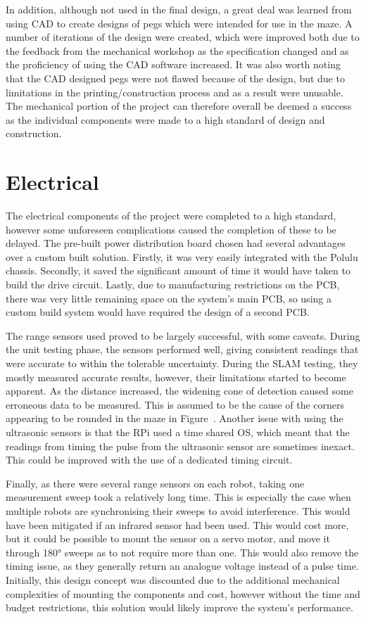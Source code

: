 In addition, although not used in the final design, a great deal was learned from
using CAD to create designs of pegs which were intended for use in the maze. A number
of iterations of the design were created, which were improved both due to the feedback from the mechanical workshop as the specification changed and as the proficiency of using the CAD software increased. It was also worth noting that the CAD designed pegs were not flawed
because of the design, but due to limitations in the printing/construction process and as a result were unusable.
The mechanical portion of the project can therefore overall be deemed a success as
the individual components were made to a high standard of design and construction.

\section{Electrical}\label{eval/elec}
The electrical components of the project were completed to a high standard,
however some unforeseen complications caused the completion of these to be delayed. The pre-built power distribution board chosen had several advantages over a
custom built solution. Firstly, it was very easily integrated with the Polulu
chassis. Secondly, it saved the significant amount of time it would have taken
to build the drive circuit. Lastly, due to manufacturing restrictions on the PCB,
there was very little remaining space on the system's main PCB, so using a custom
build system would have required the design of a second PCB.

The range sensors used proved to be largely successful, with some caveats.
During the unit testing phase, the sensors performed well, giving consistent
readings that were accurate to within the tolerable uncertainty. During the SLAM testing,
they mostly measured accurate results, however, their limitations started to
become apparent. As the distance increased, the widening cone of detection caused some
erroneous data to be measured. This is assumed to be the cause of the corners
appearing to be rounded in the maze in Figure~. Another issue with using the ultrasonic sensors is that the RPi used a time
shared OS, which meant that the readings from timing the pulse from the
ultrasonic sensor are sometimes inexact. This could be improved with the use of
a dedicated timing circuit.

Finally, as there were several range sensors on each
robot, taking one measurement sweep took a relatively long time. This is
especially the case when multiple robots are synchronising their sweeps to avoid
interference. This would have been mitigated if an infrared sensor had been used.
This would cost more, but it could be possible to mount the sensor on a servo
motor, and move it through \ang{180} sweeps as to not require more than one.
This would also remove the timing issue, as they generally return an analogue
voltage instead of a pulse time. Initially, this design concept was discounted due to the additional mechanical complexities of mounting the components and
cost, however without the time and budget restrictions, this solution would
likely improve the system's performance.


